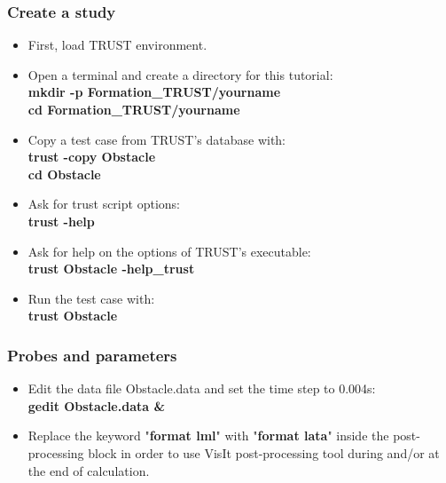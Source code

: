 \documentclass[10pt, hyperref={unicode=true,pdfusetitle, bookmarks=true,bookmarksnumbered=false,bookmarksopen=false, breaklinks=false,pdfborder={0 0l 1},backref=true,colorlinks=true,linkcolor=darkblue,pageanchor}]{beamer}
\begin{document}
\begin{frame}
\frametitle{Create a study}
\begin{block}{}

\begin{itemize}
\item First, load TRUST environment.
\vspace{0.2cm}

\item Open a terminal and create a directory for this tutorial: \\
\textbf{mkdir -p \; Formation\_TRUST/yourname}\\
\textbf{cd \; Formation\_TRUST/yourname}
\vspace{0.2cm}

\item \label{method_copy} Copy a test case from TRUST's database with:\\
\textbf{trust -copy Obstacle}\\
\textbf{cd Obstacle}
\vspace{0.2cm}

\item Ask for trust script options:\\
\textbf{trust -help}\\
\vspace{0.2cm}

\item Ask for help on the options of TRUST's executable:\\
\textbf{trust Obstacle -help\_trust}\\
\vspace{0.2cm}

\item Run the test case with:\\
\textbf{trust Obstacle}\\

\end{itemize}

\end{block}
\end{frame}
\begin{frame}
\frametitle{Probes and parameters}
\begin{block}{}

\begin{itemize}
\item Edit the data file Obstacle.data and set the time step to 0.004s:\\
\textbf{gedit Obstacle.data \&}\\

\item Replace the keyword "\textbf{format lml}" with "\textbf{format lata}" inside the post-processing block in order to use VisIt post-processing tool during and/or at the end of calculation.
\end{itemize}

\end{block}
\end{frame}
\end{document}
